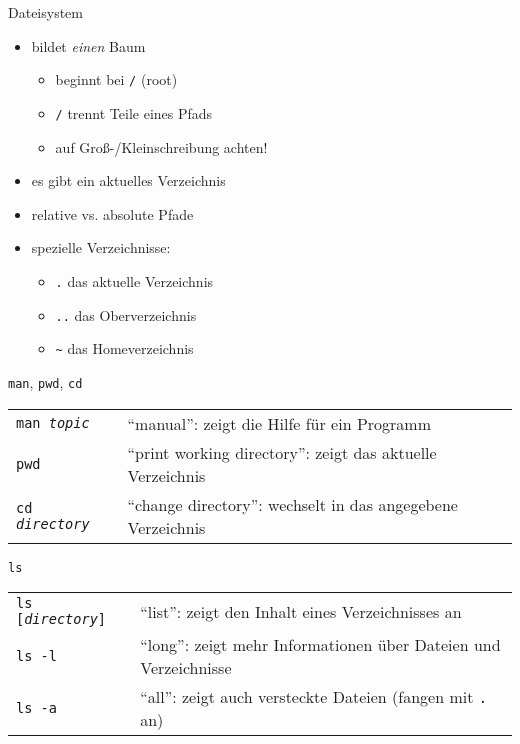 
\begin{frame}{Dateisystem}
  \begin{itemize}
    \item bildet \emph{einen} Baum
      \begin{itemize}
        \item beginnt bei \texttt{/} (root)
        \item \texttt{/} trennt Teile eines Pfads
        \item auf Groß-/Kleinschreibung achten!
      \end{itemize}
    \item es gibt ein aktuelles Verzeichnis
    \item relative vs. absolute Pfade
    \item spezielle Verzeichnisse:
      \begin{itemize}
        \item \texttt{.} das aktuelle Verzeichnis
        \item \texttt{..} das Oberverzeichnis
        \item \texttt{\textasciitilde} das Homeverzeichnis
      \end{itemize}
  \end{itemize}
\end{frame}

\begin{frame}{\texttt{man}, \texttt{pwd}, \texttt{cd}}
  \begin{tabular}{lp{20em}}
    \texttt{man \textit{topic}} & \enquote{manual}: zeigt die Hilfe für ein Programm \\
    \texttt{pwd} & \enquote{print working directory}: zeigt das aktuelle Verzeichnis \\
    \texttt{cd \textit{directory}} & \enquote{change directory}: wechselt in das angegebene Verzeichnis
  \end{tabular}
\end{frame}

\begin{frame}{\texttt{ls}}
  \begin{tabular}{lp{20em}}
    \texttt{ls [\textit{directory}]} & \enquote{list}: zeigt den Inhalt eines Verzeichnisses an \\
    \texttt{ls -l} & \enquote{long}: zeigt mehr Informationen über Dateien und Verzeichnisse \\
    \texttt{ls -a} & \enquote{all}: zeigt auch versteckte Dateien (fangen mit \texttt{.} an)
  \end{tabular}
\end{frame}

